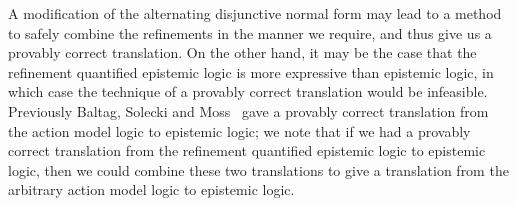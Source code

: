 A modification of the alternating disjunctive normal form may lead to a method
to safely combine the refinements in the manner we require, and thus give us a
provably correct translation. On the other hand, it may be the case that the
refinement quantified epistemic logic is more expressive than epistemic logic,
in which case the technique of a provably correct translation would be
infeasible. Previously Baltag, Solecki and Moss~\cite{baltag2004logics} gave a
provably correct translation from the action model logic to epistemic logic; we
note that if we had a provably correct translation from the refinement
quantified epistemic logic to epistemic logic, then we could combine these two
translations to give a translation from the arbitrary action model logic to
epistemic logic.
